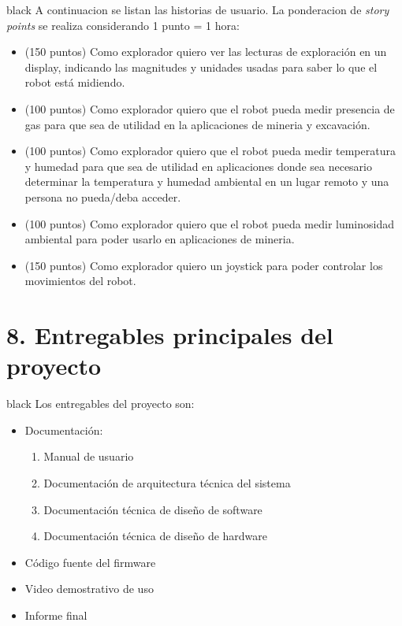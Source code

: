 \documentclass[
11pt, %
codirector, %
]{charter}
\begin{document}
\begin{consigna}{black}
A continuacion se listan las historias de usuario. La ponderacion de \textit{story points} se realiza considerando 1 punto = 1 hora:
\begin{itemize}
	\item (150 puntos) Como explorador quiero ver las lecturas de exploración en un display, indicando las magnitudes y unidades usadas para saber lo que el robot está midiendo.
	\item (100 puntos) Como explorador quiero que el robot pueda medir presencia de gas para que sea de utilidad en la aplicaciones de mineria y excavación.
	\item (100 puntos) Como explorador quiero que el robot pueda medir temperatura y humedad para que sea de utilidad en aplicaciones donde sea necesario determinar la temperatura y humedad ambiental en un lugar remoto y una persona no pueda/deba acceder.
	\item (100 puntos) Como explorador quiero que el robot pueda medir luminosidad ambiental para poder usarlo en aplicaciones de mineria.
	\item (150 puntos) Como explorador quiero un joystick para poder controlar los movimientos del robot.
\end{itemize}
\end{consigna}

\section{8. Entregables principales del proyecto}
\label{sec:entregables}
\begin{consigna}{black}
Los entregables del proyecto son:
\begin{itemize}
	\item Documentación:
	\begin{enumerate}				
		\item Manual de usuario				
		\item Documentación de arquitectura técnica del sistema
		\item Documentación técnica de diseño de software
		\item Documentación técnica de diseño de hardware						
	\end{enumerate}	
	\item Código fuente del firmware
	\item Video demostrativo de uso 
	\item Informe final
\end{itemize}
\end{consigna}
\end{document}
